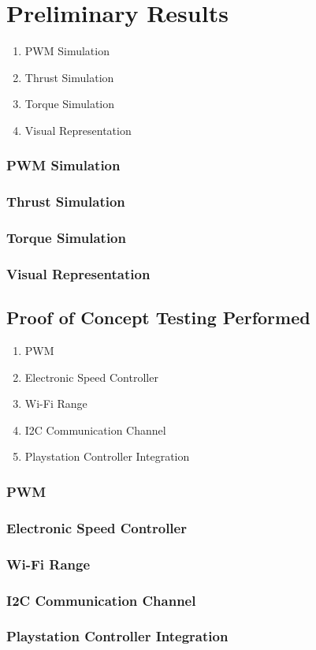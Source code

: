 \section{Preliminary Results}
\begin{enumerate}
  \item{PWM Simulation}
  \item{Thrust Simulation}
  \item{Torque Simulation}
  \item{Visual Representation}
 \end{enumerate}
  
\subsubsection{PWM Simulation}

\subsubsection{Thrust Simulation}

\subsubsection{Torque Simulation}

\subsubsection{Visual Representation}

  
\subsection{Proof of Concept Testing Performed}
\begin{enumerate}
  \item{PWM}
  \item{Electronic Speed Controller}
  \item{Wi-Fi Range}
  \item{I2C Communication Channel}
  \item{Playstation Controller Integration}
 \end{enumerate}
  
  \subsubsection{PWM}
  
  \subsubsection{Electronic Speed Controller}
  
  \subsubsection{Wi-Fi Range}
  
  \subsubsection{I2C Communication Channel}
  
  \subsubsection{Playstation Controller Integration}
